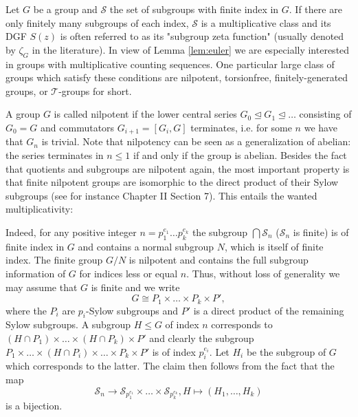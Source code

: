 \begin{exm}
\label{ex:subgroup growth}
Let $G$ be a group and $\mathcal{S}$ the set of subgroups with finite index in $G$.
If there are only finitely many subgroups of each index, $\mathcal{S}$ is a multiplicative class and its DGF $S(z)$ is often referred to as its "subgroup zeta function" (usually denoted by $\zeta_G$ in the literature).
In view of Lemma \ref{lem:euler} we are especially interested in groups with multiplicative counting sequences.
One particular large class of groups which satisfy these conditions are nilpotent, torsionfree, finitely-generated groups, or $\mathcal{T}$-groups for short.

A group $G$ is called nilpotent if the lower central series $G_0 \trianglelefteq G_1 \trianglelefteq \dots$ consisting of $G_0 = G$ and commutators $G_{i+1} = [G_i, G]$ terminates, i.e. for some $n$ we have that $G_n$ is trivial. 
Note that nilpotency can be seen as a generalization of abelian: the series terminates in $n \leq 1$ if and only if the group is abelian.
Besides the fact that quotients and subgroups are nilpotent again, the most important property is that finite nilpotent groups are isomorphic to the direct product of their Sylow subgroups (see for instance \cite{algebra} Chapter II Section 7).
This entails the wanted multiplicativity:

Indeed, for any positive integer $n = p_1^{e_1} \dots p_k^{e_k}$ the subgroup $\bigcap \mathcal{S}_n$ ($\mathcal{S}_n$ is finite) is of finite index in $G$ and contains a normal subgroup $N$, which is itself of finite index.
The finite group $G/N$ is nilpotent and contains the full subgroup information of $G$ for indices less or equal $n$.
Thus, without loss of generality we may assume that $G$ is finite and we write
\begin{equation*}
    G \cong P_1 \times \dots \times P_k \times P',
\end{equation*}
where the $P_i$ are $p_i$-Sylow subgroups and $P'$ is a direct product of the remaining Sylow subgroups.
A subgroup $H \leq G$ of index $n$ corresponds to $(H \cap P_1) \times \dots \times (H \cap P_k) \times P'$ and clearly the subgroup $P_1 \times \dots \times (H \cap P_i) \times \dots \times P_k \times P'$ is of index $p_i^{e_i}$.
Let $H_i$ be the subgroup of $G$ which corresponds to the latter.
The claim then follows from the fact that the map
\begin{equation*}
    \mathcal{S}_n \to \mathcal{S}_{p_1^{e_1}} \times \dots \times \mathcal{S}_{p_k^{e_k}}, H \mapsto (H_1, \dots, H_k)
\end{equation*}
is a bijection.


\end{exm}
